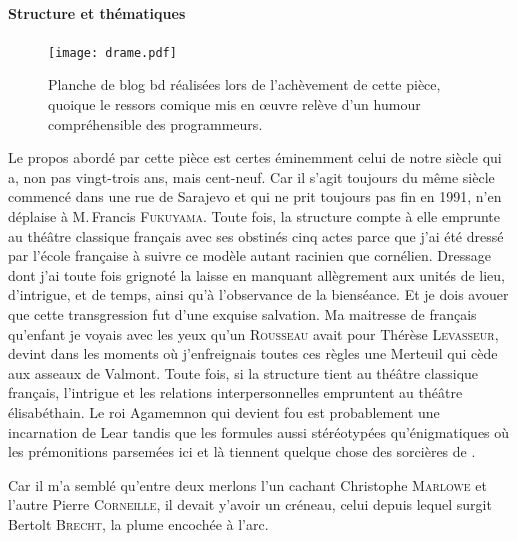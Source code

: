 \paragraph{Structure et thématiques}
\begin{figure}[!t]
	\centering
	\texttt{[image: drame.pdf]}
	\caption{Planche de blog bd réalisées lors de l’achèvement de cette pièce, quoique le ressors comique mis en œuvre relève d’un humour compréhensible des programmeurs.}
\end{figure}
Le  propos abordé par cette pièce est certes éminemment celui de notre siècle qui a, non pas vingt-trois ans, mais cent-neuf. Car il s’agit toujours du même siècle commencé dans une rue de Sarajevo et qui ne prit toujours pas fin en 1991, n’en déplaise à M.\,Francis \textsc{Fukuyama}. Toute fois, la structure compte à elle emprunte au théâtre classique français avec ses obstinés cinq actes parce que j’ai été dressé par l’école française à suivre ce modèle autant racinien que cornélien. Dressage dont j’ai toute fois grignoté la laisse en manquant allègrement aux unités de lieu, d’intrigue, et de temps, ainsi qu’à l’observance de la bienséance. Et je dois avouer que cette transgression fut d’une exquise salvation. Ma maitresse de français qu’enfant je voyais avec les yeux qu’un \textsc{Rousseau} avait pour Thérèse \textsc{Levasseur}, devint dans les moments où j’enfreignais toutes ces règles une Merteuil qui cède aux asseaux de Valmont. Toute fois, si la structure tient au théâtre classique français, l’intrigue et les relations interpersonnelles empruntent au théâtre élisabéthain. Le roi Agamemnon qui devient fou est probablement une incarnation de Lear tandis que les formules aussi stéréotypées qu’énigmatiques où les prémonitions parsemées ici et là tiennent quelque chose des sorcières de .

Car il m’a semblé qu’entre deux merlons l’un cachant Christophe \textsc{Marlowe} et l’autre Pierre \textsc{Corneille}, il devait y’avoir un créneau, celui depuis lequel surgit Bertolt \textsc{Brecht}, la plume encochée à l’arc.

